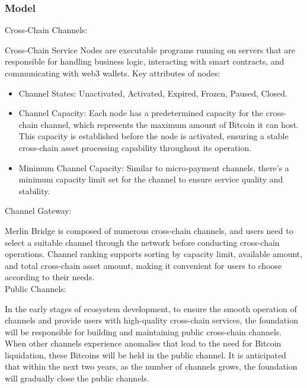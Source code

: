 \documentclass{article}
\begin{document}
\subsubsection{Model}
Cross-Chain Channels:\\
\par Cross-Chain Service Nodes are executable programs running on servers that are responsible for handling business logic, interacting with smart contracts, and communicating with web3 wallets.
Key attributes of nodes:
\begin{itemize}
    \item Channel States: Unactivated, Activated, Expired, Frozen, Paused, Closed.
    \item Channel Capacity: Each node has a predetermined capacity for the cross-chain channel, which represents the maximum amount of Bitcoin it can host. This capacity is established before the node is activated, ensuring a stable cross-chain asset processing capability throughout its operation.
    \item Minimum Channel Capacity: Similar to micro-payment channels, there's a minimum capacity limit set for the channel to ensure service quality and stability.
\end{itemize}
Channel Gateway:\\
\par Merlin Bridge is composed of numerous cross-chain channels, and users need to select a suitable channel through the network before conducting cross-chain operations. Channel ranking supports sorting by capacity limit, available amount, and total cross-chain asset amount, making it convenient for users to choose according to their needs.
\\Public Channels:\\
\par In the early stages of ecosystem development, to ensure the smooth operation of channels and provide users with high-quality cross-chain services, the foundation will be responsible for building and maintaining public cross-chain channels. When other channels experience anomalies that lead to the need for Bitcoin liquidation, these Bitcoins will be held in the public channel. It is anticipated that within the next two years, as the number of channels grows, the foundation will gradually close the public channels.
\end{document}
